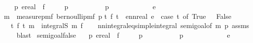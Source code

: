 \begin{isabellebody}
\ \ \ p{}\ e{\isacharcolon}{\kern0pt}{\isacharcolon}{\kern0pt}real\ \ f\isanewline
\ \ \ {\isachardoublequoteopen}{}\ {\isasymle}\ p{}{\isachardoublequoteclose}\isanewline
\ \ \ \ \ \ \ \ \ \ {\isachardoublequoteopen}p{}\ {\isasymle}\ {}{\isachardoublequoteclose}\isanewline
\ \ \ \ \ \ \ \ \ \ {\isachardoublequoteopen}e\ {\isachargreater}{\kern0pt}\ {}{\isachardoublequoteclose}\isanewline
{\isachardoublequoteopen}m\ {\isacharequal}{\kern0pt}\ measure{\isacharunderscore}{\kern0pt}pmf\ {\isacharparenleft}{\kern0pt}bernoulli{\isacharunderscore}{\kern0pt}pmf\ p{}{\isacharparenright}{\kern0pt}{\isachardoublequoteclose}\isanewline
{\isachardoublequoteopen}{\isasymAnd}t{\isachardot}{\kern0pt}\ f\ t\ {\isacharequal}{\kern0pt}\ ennreal\ e\ {\isacharasterisk}{\kern0pt}\ {\isacharparenleft}{\kern0pt}case\ t\ of\ True\ {\isasymRightarrow}\ {}{\isacharbar}{\kern0pt}\ False\ {\isasymRightarrow}\ {}{\isacharparenright}{\kern0pt}{\isachardoublequoteclose}\isanewline
{}\ {\isachardoublequoteopen}{\isasymintegral}\isactrlsup {\isacharplus}{\kern0pt}\ t{\isachardot}{\kern0pt}\ {\isacharparenleft}{\kern0pt}f\ t{\isacharparenright}{\kern0pt}\ {\isasympartial}m\ {\isacharequal}{\kern0pt}\ integral\isactrlsup S\ m\ f{\isachardoublequoteclose}\isanewline
%
\isadelimproof
\ \ %
\endisadelimproof
%
\isatagproof
{}\isamarkupfalse%
\ nn{\isacharunderscore}{\kern0pt}integral{\isacharunderscore}{\kern0pt}eq{\isacharunderscore}{\kern0pt}simple{\isacharunderscore}{\kern0pt}integral\ semi{\isacharunderscore}{\kern0pt}goal{}{}{\isacharbrackleft}{\kern0pt}of\ m\ p{}{\isacharbrackright}{\kern0pt}\ assms\isanewline
\ \ \isamarkupfalse%
\ blast%
\endisatagproof
{\isafoldproof}%
%
\isadelimproof
\isanewline
%
\endisadelimproof
\isanewline
{}\isamarkupfalse%
\ semi{\isacharunderscore}{\kern0pt}goal{}{}{\isacharunderscore}{\kern0pt}false{\isacharcolon}{\kern0pt}\isanewline
\ \ \ p{}\ e{\isacharcolon}{\kern0pt}{\isacharcolon}{\kern0pt}real\ \ f\isanewline
\ \ \ {\isachardoublequoteopen}{}\ {\isasymle}\ p{}{\isachardoublequoteclose}\isanewline
\ \ \ \ \ \ \ \ \ \ {\isachardoublequoteopen}p{}\ {\isasymle}\ {}{\isachardoublequoteclose}\isanewline
\ \ \ \ \ \ \ \ \ \ {\isachardoublequoteopen}e\ {\isachargreater}{\kern0pt}\ {}{\isachardoublequoteclose}\isanewline

\end{isabellebody}
